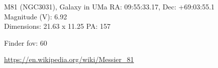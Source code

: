 \begin{block}{M81 (NGC3031), Galaxy in UMa}
    RA: 09:55:33.17, Dec: +69:03:55.1 \\ 
    Magnitude (V): 6.92 \\ 
    Dimensions: 21.63 x 11.25 PA: 157 

    Finder fov: 60 

    \url{https://en.wikipedia.org/wiki/Messier_81} 
\end{block}